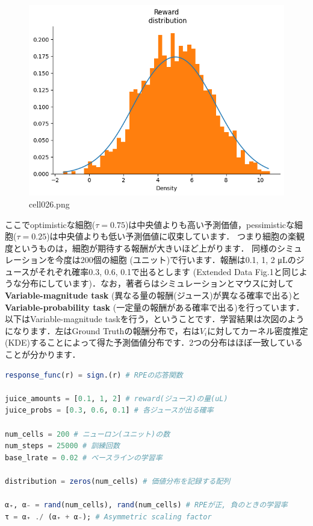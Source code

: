 \begin{figure}[ht]
	\centering
	\includegraphics[scale=0.8, max width=\linewidth]{./fig/bayesian-brain/quantile-expectile-regression/cell026.png}
	\caption{cell026.png}
	\label{cell026.png}
\end{figure}
ここでoptimisticな細胞($\tau=0.75$)は中央値よりも高い予測価値，pessimisticな細胞($\tau=0.25$)は中央値よりも低い予測価値に収束しています． つまり細胞の楽観度というものは，細胞が期待する報酬が大きいほど上がります．
同様のシミュレーションを今度は200個の細胞 (ユニット)で行います．報酬は0.1, 1, 2 μLのジュースがそれぞれ確率0.3, 0.6, 0.1で出るとします (Extended Data Fig.1と同じような分布にしています)．なお，著者らはシミュレーションとマウスに対して\textbf{Variable-magnitude task}
(異なる量の報酬(ジュース)が異なる確率で出る)と\textbf{Variable-probability task} (一定量の報酬がある確率で出る)を行っています．以下はVariable-magnitude taskを行う，ということです．学習結果は次図のようになります．左はGround Truthの報酬分布で，右は$V_i$に対してカーネル密度推定
(KDE)することによって得た予測価値分布です．2つの分布はほぼ一致していることが分かります．
\begin{lstlisting}[language=julia]
response_func(r) = sign.(r) # RPEの応答関数
 
juice_amounts = [0.1, 1, 2] # reward(ジュース)の量(uL)
juice_probs = [0.3, 0.6, 0.1] # 各ジュースが出る確率

num_cells = 200 # ニューロン(ユニット)の数
num_steps = 25000 # 訓練回数
base_lrate = 0.02 # ベースラインの学習率
   
distribution = zeros(num_cells) # 価値分布を記録する配列

α₊, α₋ = rand(num_cells), rand(num_cells) # RPEが正, 負のときの学習率
τ = α₊ ./ (α₊ + α₋); # Asymmetric scaling factor
\end{lstlisting}
